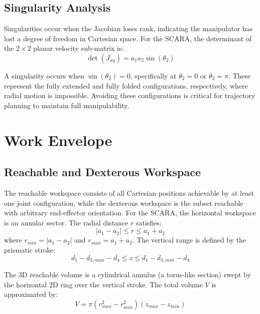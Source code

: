 \documentclass{article}
\begin{document}
\subsection{Singularity Analysis}
Singularities occur when the Jacobian loses rank, indicating the manipulator has lost a degree of freedom in Cartesian space. For the SCARA, the determinant of the $2 \times 2$ planar velocity sub-matrix is:
\begin{equation}
\det(J_{xy}) = a_1 a_2 \sin(\theta_2) \tag{5.3}
\end{equation}

A singularity occurs when $\sin(\theta_2) = 0$, specifically at $\theta_2 = 0$ or $\theta_2 = \pi$. These represent the fully extended and fully folded configurations, respectively, where radial motion is impossible. Avoiding these configurations is critical for trajectory planning to maintain full manipulability.




\section{Work Envelope}

\subsection{Reachable and Dexterous Workspace}
The reachable workspace consists of all Cartesian positions achievable by at least one joint configuration, while the dexterous workspace is the subset reachable with arbitrary end-effector orientation. For the SCARA, the horizontal workspace is an annular sector. The radial distance $r$ satisfies:
\begin{equation}
|a_1 - a_2| \leq r \leq a_1 + a_2 \tag{6.1}
\end{equation}
where $r_{min} = |a_1 - a_2|$ and $r_{max} = a_1 + a_2$. The vertical range is defined by the prismatic stroke:
\begin{equation}
d_1 - d_{3,max} - d_4 \leq z \leq d_1 - d_{3,min} - d_4 \tag{6.2}
\end{equation}

The 3D reachable volume is a cylindrical annulus (a torus-like section) swept by the horizontal 2D ring over the vertical stroke. The total volume $V$ is approximated by:
\begin{equation}
V = \pi (r_{max}^2 - r_{min}^2) (z_{max} - z_{min}) \tag{6.3}
\end{equation}
\end{document}
